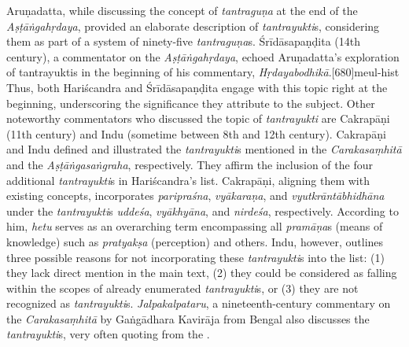 Aruṇadatta, while discussing the concept of \emph{tantraguṇa} at the end of the \emph{Aṣṭāṅgahṛdaya}, provided an elaborate description of \emph{tantrayukti}s, considering them as part of a system of ninety-five \emph{tantraguṇa}s. Śrīdāsapaṇḍita (14th century), a commentator on the \emph{Aṣṭāṅgahṛdaya}, echoed Aruṇadatta's exploration of tantrayuktis in the beginning of his commentary, \emph{Hṛdayabodhikā}.[680]{meul-hist} Thus, both Hariścandra and Śrīdāsapaṇḍita engage with this topic right at the beginning, underscoring the significance they attribute to the subject. Other noteworthy commentators who discussed the topic of \emph{tantrayukti} are Cakrapāṇi (11th century) and Indu (sometime between 8th and 12th century). Cakrapāṇi and Indu defined and illustrated the \emph{tantrayukti}s mentioned in the \emph{Carakasaṃhitā} and the \emph{Aṣṭāṅgasaṅgraha}, respectively. They affirm the inclusion of the four additional \emph{tantrayukti}s in Hariścandra's list. Cakrapāṇi, aligning them with existing concepts, incorporates \emph{paripraśna}, \emph{vyākaraṇa}, and \emph{vyutkrāntābhidhāna} under the \emph{tantrayukti}s \emph{uddeśa}, \emph{vyākhyāna}, and \emph{nirdeśa}, respectively. According to him, \emph{hetu} serves as an overarching term encompassing all \emph{pramāṇa}s (means of knowledge) such as \emph{pratyakṣa} (perception) and others. Indu, however, outlines three possible reasons for not incorporating these \emph{tantrayukti}s into the list: (1) they lack direct mention in the main text, (2) they could be considered as falling within the scopes of already enumerated \emph{tantrayukti}s, or (3) they are not recognized as \emph{tantrayukti}s. \emph{Jalpakalpataru}, a nineteenth-century commentary on the \emph{Carakasaṃhitā} by Gaṅgādhara Kavirāja from Bengal also discusses the \emph{tantrayukti}s, very often quoting from the \SS.  

